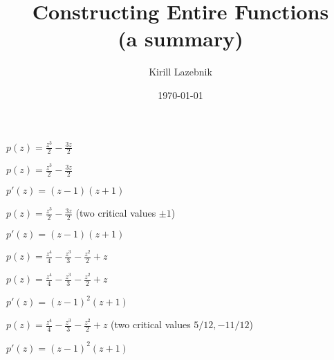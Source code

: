 \documentclass{beamer}
\title[  ]{Constructing Entire Functions \hspace{10mm}  \\ (a summary)} %
\author{Kirill Lazebnik} %
\institute[SUNY Stony Brook] %
{
SUNY Stony Brook \\ %
\medskip
\textit{Kirill.Lazebnik@stonybrook.edu} %
}
\date{ \today } %
\begin{document}
\begin{frame}
\titlepage %
\end{frame}










\begin{frame}

$p(z)=\frac{z^3}{2}-\frac{3z}{2}$

\end{frame}



\begin{frame}

$p(z)=\frac{z^3}{2}-\frac{3z}{2} $

\vspace{5mm}

$p'(z)=(z-1)(z+1)$

\end{frame}



\begin{frame}

$p(z)=\frac{z^3}{2}-\frac{3z}{2} $ (two critical values $\pm 1$)

\vspace{5mm}

$p'(z)=(z-1)(z+1)$

\end{frame}




\begin{frame}

$p(z)=\frac{z^4}{4} - \frac{z^3}{3} - \frac{z^2}{2} + z$

\end{frame}


\begin{frame}

$p(z)=\frac{z^4}{4} - \frac{z^3}{3} - \frac{z^2}{2} + z$

\vspace{5mm}

$p'(z)=(z-1)^2(z+1)$

\end{frame}


\begin{frame}

$p(z)=\frac{z^4}{4} - \frac{z^3}{3} - \frac{z^2}{2} + z$ (two critical values $5/12, -11/12$)

\vspace{5mm}

$p'(z)=(z-1)^2(z+1)$

\end{frame}
\end{document}
